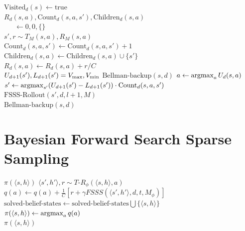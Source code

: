 \begin{algorithm}[tb]
	\caption{$\mbox{FSSS-Rollout}(s, d, l, M)$}
	\label{alg:fs3-rollout}
	 {
		\Return
	}
	 {
		$\mbox{Visited}_d(s) \leftarrow \mbox{true}$\\
		 {
			$R_d(s,a),\mbox{Count}_d(s,a,s'),\mbox{Children}_d(s,a)$\\
			\ \ \ $\leftarrow 0, 0, \{\}$\\
			 {
				$s', r \sim T_M(s, a), R_M(s,a)$ \\
				$\mbox{Count}_d(s,a,s') \leftarrow \mbox{Count}_d(s,a,s') + 1$ \\
				$\mbox{Children}_d(s,a) \leftarrow \mbox{Children}_d(s,a) \cup \{s'\}$ \\
				$R_d(s,a) \leftarrow R_d(s, a)+r/C$\\
				 {
					 $U_{d+1}(s'), L_{d+1}(s') = V_{\rm max}, V_{\rm min}$
				}
			}
		}
		$\mbox{Bellman-backup}(s, d)$
	}
	$a \leftarrow \argmax_a U_d(s,a)$\\
	$s' \leftarrow \argmax_{s'} (U_{d+1}(s')-L_{d+1}(s')) \cdot \mbox{Count}_d(s,a,s')$\\
	$\mbox{FSSS-Rollout}(s', d, l+1, M)$\\
	$\mbox{Bellman-backup}(s, d)$\\
	\Return
\end{algorithm}

\section{Bayesian Forward Search Sparse Sampling}


\begin{algorithm}[tb]
	\caption{$\mbox{BFS3}(s, h, d, t, \phi)$}
	\label{alg:bfs3}
	 {
		\Return $\pi(\langle s,h \rangle)$
	}
	 {
		 {
			$\langle s', h'\rangle , r \sim {T\mbox{-}R}_\phi(\langle s,h\rangle, a)$
			$q(a) \leftarrow q(a) + \frac 1 C \left[r+ \gamma FSSS(\langle s', h'\rangle, d, t, M_\phi)\right]$
		}
	}
	$\mbox{solved-belief-states} \leftarrow \mbox{solved-belief-states} \bigcup \{\langle s,h\rangle\}$\\
	$\pi(\langle s,h\rangle) \leftarrow \argmax_a q(a)$\\
	\Return $\pi(\langle s,h\rangle)$\\
\end{algorithm}


